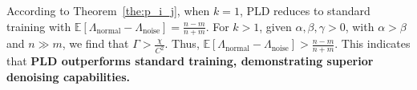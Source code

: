 
According to Theorem~\ref{the:p_i_j}, when \(k=1\), PLD reduces to standard training with \(\mathbb{E}[\Lambda_{\text{normal}} - \Lambda_{\text{noise}}] = \frac{n - m}{n + m}\). For \(k>1\), given \(\alpha, \beta, \gamma > 0\), with \(\alpha > \beta\) and \(n \gg m\), we find that \(\Gamma > \frac{\chi}{C^2}\). Thus, \(\mathbb{E}[\Lambda_{\text{normal}} - \Lambda_{\text{noise}}] > \frac{n - m}{n + m}\). This indicates that \textbf{PLD outperforms standard training, demonstrating superior denoising capabilities.}

